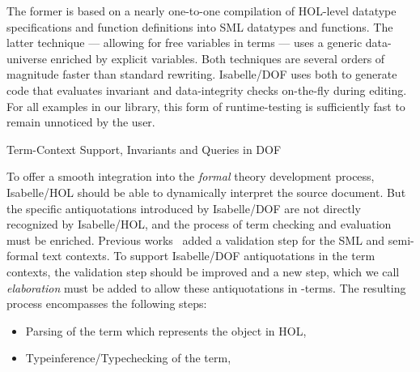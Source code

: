 \begin{isabellebody}
\begin{isamarkuptext}
\noindent  The former is based on a nearly one-to-one compilation of HOL-level datatype specifications 
and function definitions into SML datatypes and functions.
The latter technique --- allowing for free variables in terms --- uses a generic data-universe
enriched by explicit variables. Both techniques are several orders of magnitude faster 
than standard rewriting. Isabelle/DOF uses both to generate code that evaluates invariant and data-integrity 
checks on-the-fly during editing. For all examples in our library, this form of runtime-testing
 is sufficiently fast to remain unnoticed by the user.
\end{isamarkuptext}\isamarkuptrue%

\begin{isamarkupsection*}
[label = {invariants},type = {scholarly_paper.technical}, args={label = {invariants},type = {scholarly_paper.technical}, scholarly_paper.text_section.main_author = {@{docitem ''nic''}}, Isa_COL.text_element.level = {}, Isa_COL.text_element.referentiable = {False}, Isa_COL.text_element.variants = {{STR ''outline'', STR ''document''}}, scholarly_paper.text_section.fixme_list = {}, Isa_COL.text_element.level = {}, scholarly_paper.technical.definition_list = {}, scholarly_paper.technical.status = {description}}]Term-Context Support, Invariants and Queries in DOF
\end{isamarkupsection*}\isamarkuptrue%

\begin{isamarkuptext}
To offer a smooth integration into the \emph{formal} theory development process,
Isabelle/HOL should be able to dynamically interpret the source document.
But the specific antiquotations introduced by Isabelle/DOF are not directly recognized
by Isabelle/HOL, and the process of term checking and evaluation must be enriched.
Previous works~\cite{brucker.ea:isabelle-ontologies:2018,brucker.ea:isabelledof:2019}
added a validation step for the SML and semi-formal text contexts.
To support Isabelle/DOF antiquotations in the term contexts, the validation step should
be improved and a new step, which we call \emph{elaboration} must be added to allow
these antiquotations in \isa{{\isasymlambda}}-terms.
The resulting process encompasses the following steps:

%
\begin{itemize}%
\item Parsing of the term which represents the object in HOL,

\item Typeinference/Typechecking of the term,


\end{itemize}
\end{isamarkuptext}
\end{isabellebody}
